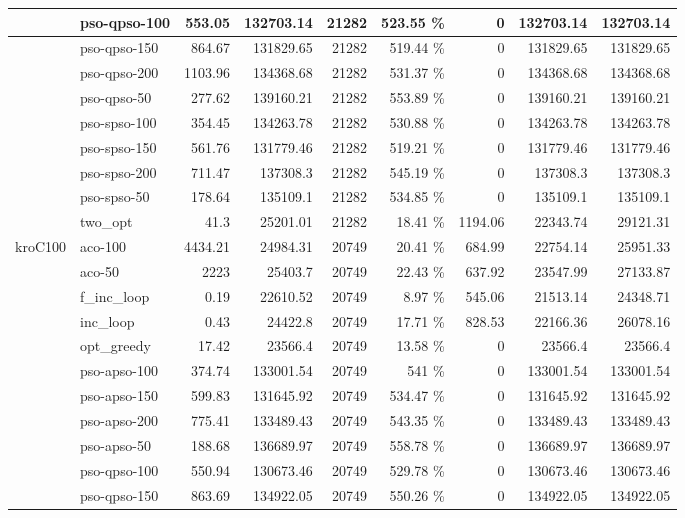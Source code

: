 \documentclass[conference]{IEEEtran}
\begin{document}
\begin{center}
\begin{longtable}[ht]{|l|l|r|r|r|r|r|r|r|}
 & pso-qpso-100 & 553.05 & 132703.14 & 21282 & 523.55 \% & 0 & 132703.14 & 132703.14 \\ \hline
 & pso-qpso-150 & 864.67 & 131829.65 & 21282 & 519.44 \% & 0 & 131829.65 & 131829.65 \\ \hline
 & pso-qpso-200 & 1103.96 & 134368.68 & 21282 & 531.37 \% & 0 & 134368.68 & 134368.68 \\ \hline
 & pso-qpso-50 & 277.62 & 139160.21 & 21282 & 553.89 \% & 0 & 139160.21 & 139160.21 \\ \hline
 & pso-spso-100 & 354.45 & 134263.78 & 21282 & 530.88 \% & 0 & 134263.78 & 134263.78 \\ \hline
 & pso-spso-150 & 561.76 & 131779.46 & 21282 & 519.21 \% & 0 & 131779.46 & 131779.46 \\ \hline
 & pso-spso-200 & 711.47 & 137308.3 & 21282 & 545.19 \% & 0 & 137308.3 & 137308.3 \\ \hline
 & pso-spso-50 & 178.64 & 135109.1 & 21282 & 534.85 \% & 0 & 135109.1 & 135109.1 \\ \hline
 & two\_opt & 41.3 & 25201.01 & 21282 & 18.41 \% & 1194.06 & 22343.74 & 29121.31 \\ \hline
kroC100 & aco-100 & 4434.21 & 24984.31 & 20749 & 20.41 \% & 684.99 & 22754.14 & 25951.33 \\ \hline
 & aco-50 & 2223 & 25403.7 & 20749 & 22.43 \% & 637.92 & 23547.99 & 27133.87 \\ \hline
 & f\_inc\_loop & 0.19 & 22610.52 & 20749 & 8.97 \% & 545.06 & 21513.14 & 24348.71 \\ \hline
 & inc\_loop & 0.43 & 24422.8 & 20749 & 17.71 \% & 828.53 & 22166.36 & 26078.16 \\ \hline
 & opt\_greedy & 17.42 & 23566.4 & 20749 & 13.58 \% & 0 & 23566.4 & 23566.4 \\ \hline
 & pso-apso-100 & 374.74 & 133001.54 & 20749 & 541 \% & 0 & 133001.54 & 133001.54 \\ \hline
 & pso-apso-150 & 599.83 & 131645.92 & 20749 & 534.47 \% & 0 & 131645.92 & 131645.92 \\ \hline
 & pso-apso-200 & 775.41 & 133489.43 & 20749 & 543.35 \% & 0 & 133489.43 & 133489.43 \\ \hline
 & pso-apso-50 & 188.68 & 136689.97 & 20749 & 558.78 \% & 0 & 136689.97 & 136689.97 \\ \hline
 & pso-qpso-100 & 550.94 & 130673.46 & 20749 & 529.78 \% & 0 & 130673.46 & 130673.46 \\ \hline
 & pso-qpso-150 & 863.69 & 134922.05 & 20749 & 550.26 \% & 0 & 134922.05 & 134922.05 \\ \hline

\end{longtable}
\end{center}
\end{document}

